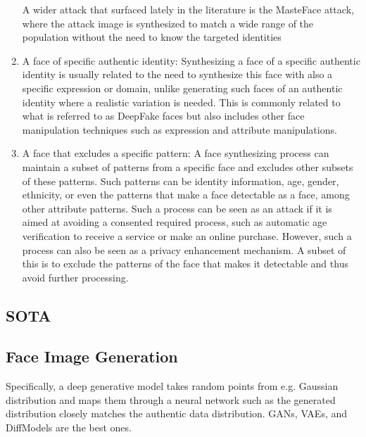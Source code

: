 \documentclass[12pt]{article}
\begin{document}
\begin{enumerate}
  A wider attack that surfaced lately in the literature is the MasteFace attack, where the attack
image is synthesized to match a wide range of
the population without the need to know the
targeted identities  
\item A face of specific authentic identity: Synthesizing a face of a specific authentic identity
is usually related to the need to synthesize this
face with also a specific expression or domain,
unlike generating such faces of an authentic identity where a realistic variation is needed. This is
commonly related to what is referred to as DeepFake faces but also includes other face manipulation techniques such as expression and attribute
manipulations.
\item A face that excludes a specific pattern:
A face synthesizing process can maintain a subset of patterns from a specific face and excludes
other subsets of these patterns. Such patterns can be identity information, age, gender, ethnicity, or even the patterns that make a face detectable as a face, among other attribute patterns. Such a process can be seen as an attack
if it is aimed at avoiding a consented required
process, such as automatic age verification to receive a service or make an online purchase. However, such a process can also be seen as a privacy
enhancement mechanism. A subset of this is to exclude
the patterns of the face that makes it detectable
and thus avoid further processing.
\end{enumerate}
\subsection{SOTA}
\subsection{Face Image Generation}
Specifically, a deep generative model takes
random points from e.g. Gaussian distribution and
maps them through a neural network such as the
generated distribution closely matches the authentic
data distribution. GANs, VAEs, and DiffModels are the best ones.
\end{document}
